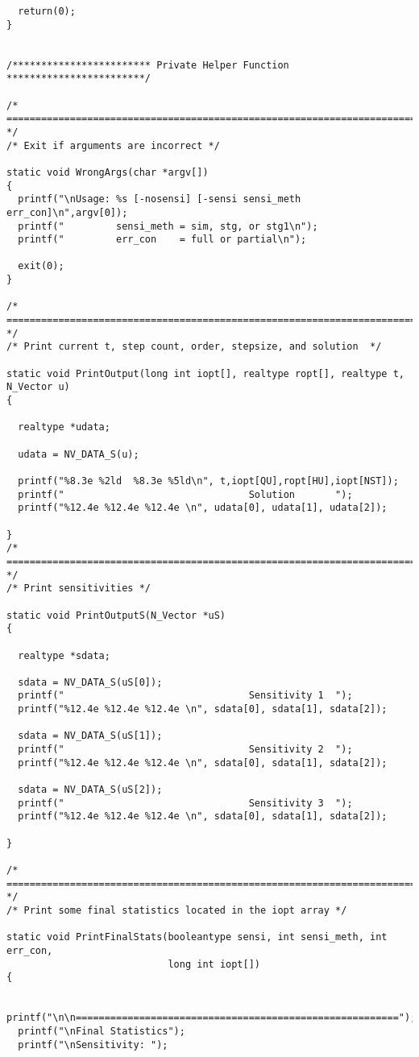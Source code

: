 \begin{verbatim}
  return(0);
}


/************************ Private Helper Function ************************/

/* ======================================================================= */
/* Exit if arguments are incorrect */

static void WrongArgs(char *argv[])
{
  printf("\nUsage: %s [-nosensi] [-sensi sensi_meth err_con]\n",argv[0]);
  printf("         sensi_meth = sim, stg, or stg1\n");
  printf("         err_con    = full or partial\n");
  
  exit(0);
}

/* ======================================================================= */
/* Print current t, step count, order, stepsize, and solution  */

static void PrintOutput(long int iopt[], realtype ropt[], realtype t, N_Vector u)
{

  realtype *udata;
  
  udata = NV_DATA_S(u);

  printf("%8.3e %2ld  %8.3e %5ld\n", t,iopt[QU],ropt[HU],iopt[NST]);
  printf("                                Solution       ");
  printf("%12.4e %12.4e %12.4e \n", udata[0], udata[1], udata[2]);
  
}
/* ======================================================================= */
/* Print sensitivities */

static void PrintOutputS(N_Vector *uS)
{

  realtype *sdata;

  sdata = NV_DATA_S(uS[0]);
  printf("                                Sensitivity 1  ");
  printf("%12.4e %12.4e %12.4e \n", sdata[0], sdata[1], sdata[2]);
  
  sdata = NV_DATA_S(uS[1]);
  printf("                                Sensitivity 2  ");
  printf("%12.4e %12.4e %12.4e \n", sdata[0], sdata[1], sdata[2]);

  sdata = NV_DATA_S(uS[2]);
  printf("                                Sensitivity 3  ");
  printf("%12.4e %12.4e %12.4e \n", sdata[0], sdata[1], sdata[2]);

}

/* ======================================================================= */
/* Print some final statistics located in the iopt array */

static void PrintFinalStats(booleantype sensi, int sensi_meth, int err_con, 
                            long int iopt[])
{

  printf("\n\n========================================================");
  printf("\nFinal Statistics");
  printf("\nSensitivity: ");


\end{verbatim}
